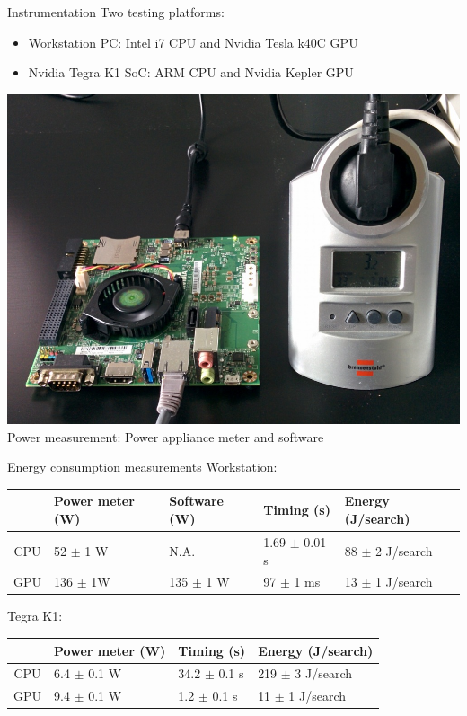 \documentclass{beamer}
\newenvironment{changemargin}[2]{%
  \begin{list}{}{%
    \setlength{\topsep}{0pt}%
    \setlength{\leftmargin}{#1}%
    \setlength{\rightmargin}{#2}%
    \setlength{\listparindent}{\parindent}%
    \setlength{\itemindent}{\parindent}%
    \setlength{\parsep}{\parskip}%
  }%
  \item[]}{\end{list}}
\begin{document}
\begin{frame}{Instrumentation}
Two testing platforms:
\begin{itemize}
\item Workstation PC: Intel i7 CPU and Nvidia Tesla k40C GPU
\item Nvidia Tegra K1 SoC: ARM CPU and Nvidia Kepler GPU
\end{itemize}
\begin{center}
\includegraphics[scale=0.2]{images/tk1.jpg}\\
Power measurement: Power appliance meter and software
\end{center}
\end{frame}

\begin{frame}{Energy consumption measurements}
Workstation:
\vspace{2mm}
\begin{changemargin}{-2cm}{-2cm}
\begin{table}[h]
\begin{tabular}{c | l l l | l}
 & Power meter (W) & Software (W) & Timing (s) & Energy (J/search) \\
\hline
CPU & 52 $\pm$ 1 W & N.A. & 1.69 $\pm$ 0.01 s & 88 $\pm$ 2 J/search \\
GPU & 136 $\pm$ 1W & 135 $\pm$ 1 W & 97 $\pm$ 1 ms & 13 $\pm$ 1 J/search\\
\end{tabular}
\end{table}
\end{changemargin}
\vspace{10mm}
Tegra K1:
\vspace{2mm}
\begin{changemargin}{-2cm}{-2cm}
\begin{table}[h]
\begin{tabular}{c | l l | l}
 & Power meter (W) & Timing (s) & Energy (J/search) \\
\hline
CPU & 6.4 $\pm$ 0.1 W & 34.2 $\pm$ 0.1 s & 219 $\pm$ 3 J/search \\
GPU & 9.4 $\pm$ 0.1 W & 1.2 $\pm$ 0.1 s & 11 $\pm$ 1 J/search\\
\end{tabular}
\end{table}
\end{changemargin}
\end{frame}
\end{document}
